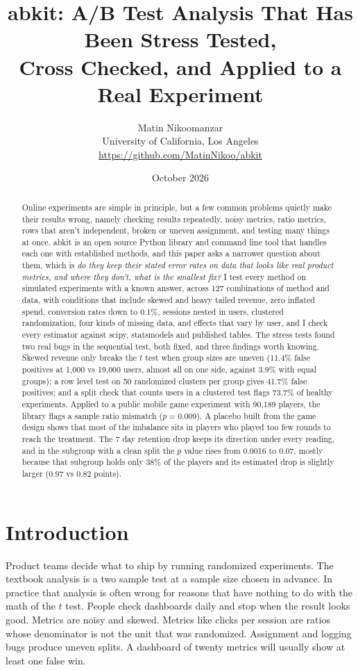 \documentclass[10pt]{article}
\title{\textbf{abkit: A/B Test Analysis That Has Been Stress Tested,\\Cross Checked, and Applied to a Real Experiment}}
\author{Matin Nikoomanzar\\University of California, Los Angeles\\\small\url{https://github.com/MatinNikoo/abkit}}
\date{October 2026}
\begin{document}
\maketitle

\begin{abstract}
\noindent Online experiments are simple in principle, but a few common problems quietly make their results wrong, namely checking results repeatedly, noisy metrics, ratio metrics, rows that aren't independent, broken or uneven assignment, and testing many things at once. abkit is an open source Python library and command line tool that handles each one with established methods, and this paper asks a narrower question about them, which is \emph{do they keep their stated error rates on data that looks like real product metrics, and where they don't, what is the smallest fix?} I test every method on simulated experiments with a known answer, across 127 combinations of method and data, with conditions that include skewed and heavy tailed revenue, zero inflated spend, conversion rates down to 0.1\%, sessions nested in users, clustered randomization, four kinds of missing data, and effects that vary by user, and I check every estimator against scipy, statsmodels and published tables. The stress tests found two real bugs in the sequential test, both fixed, and three findings worth knowing. Skewed revenue only breaks the $t$ test when group sizes are uneven (11.4\% false positives at 1,000 vs 19,000 users, almost all on one side, against 3.9\% with equal groups); a row level test on 50 randomized clusters per group gives 41.7\% false positives; and a split check that counts users in a clustered test flags 73.7\% of healthy experiments. Applied to a public mobile game experiment with 90,189 players, the library flags a sample ratio mismatch ($p = 0.009$). A placebo built from the game design shows that most of the imbalance sits in players who played too few rounds to reach the treatment. The 7 day retention drop keeps its direction under every reading, and in the subgroup with a clean split the $p$ value rises from 0.0016 to 0.07, mostly because that subgroup holds only 38\% of the players and its estimated drop is slightly larger (0.97 vs 0.82 points).
\end{abstract}

\section{Introduction}
Product teams decide what to ship by running randomized experiments. The textbook analysis is a two sample test at a sample size chosen in advance. In practice that analysis is often wrong for reasons that have nothing to do with the math of the $t$ test. People check dashboards daily and stop when the result looks good. Metrics are noisy and skewed. Metrics like clicks per session are ratios whose denominator is not the unit that was randomized. Assignment and logging bugs produce uneven splits. A dashboard of twenty metrics will usually show at least one false win.
\end{document}
